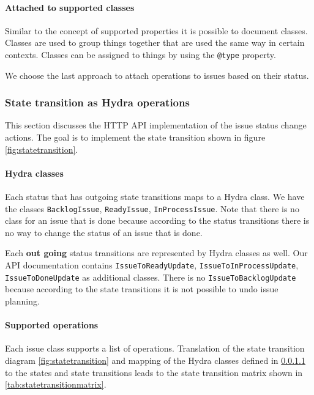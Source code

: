 \paragraph{Attached to supported classes}
Similar to the concept of supported properties it is possible to document classes. Classes are used to group things together that are used the same way in certain contexts. Classes can be assigned to things by using the \lstinline{@type} property.

We choose the last approach to attach operations to issues based on their status.

\subsubsection{State transition as Hydra operations}
This section discusses the HTTP API implementation of the issue status change actions. The goal is to implement the state transition shown in figure \ref{fig:statetransition}.

\paragraph{Hydra classes}\label{par:classes}
Each status that has outgoing state transitions maps to a Hydra class. We have the classes \lstinline{BacklogIssue}, \lstinline{ReadyIssue}, \lstinline{InProcessIssue}. Note that there is no class for an issue that is done because according to the status transitions there is no way to change the status of an issue that is done.

Each \textbf{out going} status transitions are represented by Hydra classes as well. Our API documentation contains \lstinline{IssueToReadyUpdate}, \lstinline{IssueToInProcessUpdate}, \lstinline{IssueToDoneUpdate} as additional classes. There is no \lstinline{IssueToBacklogUpdate} because according to the state transitions it is not possible to undo issue planning.

\paragraph{Supported operations}
Each issue class supports a list of operations. Translation of the state transition diagram \ref{fig:statetransition} and mapping of the Hydra classes defined in \ref{par:classes} to the states and state transitions leads to the state transition matrix shown in \ref{tab:statetransitionmatrix}.


